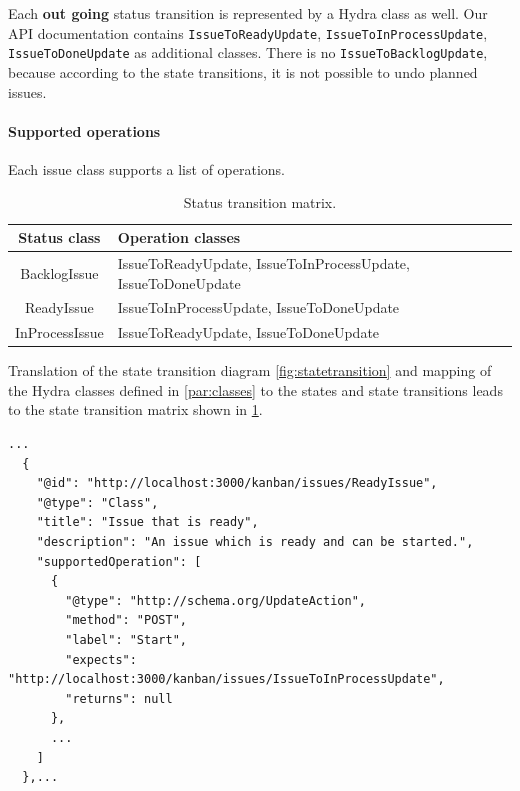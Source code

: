Each \textbf{out going} status transition is represented by a Hydra class as well. Our API documentation contains \lstinline{IssueToReadyUpdate}, \lstinline{IssueToInProcessUpdate}, \lstinline{IssueToDoneUpdate} as additional classes. There is no \lstinline{IssueToBacklogUpdate}, because according to the state transitions, it is not possible to undo planned issues.

\paragraph{Supported operations}
Each issue class supports a list of operations.

\begin{table}
  \begin{center}
    \begin{tabular}{ |c|l| }
      \hline
      Status class & Operation classes \\
      \hline
      BacklogIssue & IssueToReadyUpdate, IssueToInProcessUpdate, IssueToDoneUpdate \\
      ReadyIssue & IssueToInProcessUpdate, IssueToDoneUpdate \\
      InProcessIssue & IssueToReadyUpdate, IssueToDoneUpdate \\
      \hline
    \end{tabular}
    \caption{Status transition matrix.}
    \label{tab:statetransitionmatrix}
  \end{center}
\end{table}

Translation of the state transition diagram \ref{fig:statetransition} and mapping of the Hydra classes defined in \ref{par:classes} to the states and state transitions leads to the state transition matrix shown in \ref{tab:statetransitionmatrix}.

\lstset{language=JSON}
\begin{lstlisting}[caption=Exempt of the Hydra documentation showing the list of supported operations for the issue status class ReadyIssue.]
  ...
  {
    "@id": "http://localhost:3000/kanban/issues/ReadyIssue",
    "@type": "Class",
    "title": "Issue that is ready",
    "description": "An issue which is ready and can be started.",
    "supportedOperation": [
      {
        "@type": "http://schema.org/UpdateAction",
        "method": "POST",
        "label": "Start",
        "expects": "http://localhost:3000/kanban/issues/IssueToInProcessUpdate",
        "returns": null
      },
      ...
    ]
  },...
\end{lstlisting}

